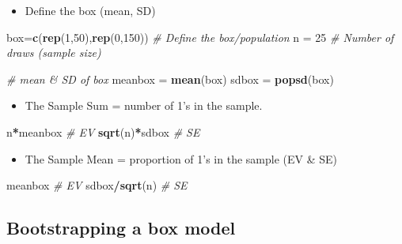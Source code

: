 \documentclass[]{article}
\newenvironment{Shaded}{\begin{snugshade}}{\end{snugshade}}
\newcommand{\CommentTok}[1]{\textcolor[rgb]{0.56,0.35,0.01}{\textit{#1}}}
\newcommand{\DecValTok}[1]{\textcolor[rgb]{0.00,0.00,0.81}{#1}}
\newcommand{\KeywordTok}[1]{\textcolor[rgb]{0.13,0.29,0.53}{\textbf{#1}}}
\newcommand{\NormalTok}[1]{#1}
\newcommand{\OperatorTok}[1]{\textcolor[rgb]{0.81,0.36,0.00}{\textbf{#1}}}
\newcommand{\StringTok}[1]{\textcolor[rgb]{0.31,0.60,0.02}{#1}}
\providecommand{\tightlist}{%
  \setlength{\itemsep}{0pt}\setlength{\parskip}{0pt}}
\begin{document}
\begin{itemize}
\tightlist
\item
  Define the box (mean, SD)
\end{itemize}

\begin{Shaded}
\begin{Highlighting}[]
\NormalTok{box=}\KeywordTok{c}\NormalTok{(}\KeywordTok{rep}\NormalTok{(}\DecValTok{1}\NormalTok{,}\DecValTok{50}\NormalTok{),}\KeywordTok{rep}\NormalTok{(}\DecValTok{0}\NormalTok{,}\DecValTok{150}\NormalTok{))  }\CommentTok{# Define the box/population}
\NormalTok{n =}\StringTok{ }\DecValTok{25} \CommentTok{# Number of draws (sample size)}

\CommentTok{# mean & SD of box}
\NormalTok{meanbox =}\StringTok{ }\KeywordTok{mean}\NormalTok{(box)}
\NormalTok{sdbox =}\StringTok{ }\KeywordTok{popsd}\NormalTok{(box)}
\end{Highlighting}
\end{Shaded}

\begin{itemize}
\tightlist
\item
  The Sample Sum = number of 1's in the sample.
\end{itemize}

\begin{Shaded}
\begin{Highlighting}[]
\NormalTok{n}\OperatorTok{*}\NormalTok{meanbox  }\CommentTok{# EV}
\KeywordTok{sqrt}\NormalTok{(n)}\OperatorTok{*}\NormalTok{sdbox  }\CommentTok{# SE}
\end{Highlighting}
\end{Shaded}

\begin{itemize}
\tightlist
\item
  The Sample Mean = proportion of 1's in the sample (EV \& SE)
\end{itemize}

\begin{Shaded}
\begin{Highlighting}[]
\NormalTok{meanbox  }\CommentTok{# EV}
\NormalTok{sdbox}\OperatorTok{/}\KeywordTok{sqrt}\NormalTok{(n)  }\CommentTok{# SE}
\end{Highlighting}
\end{Shaded}

\hypertarget{bootstrapping-a-box-model}{%
\subsection{Bootstrapping a box model}\label{bootstrapping-a-box-model}}
\end{document}
